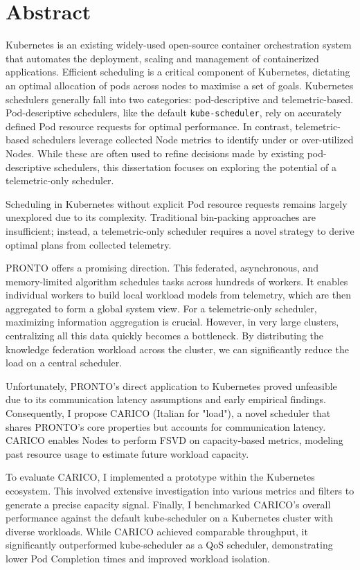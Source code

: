\chapter*{Abstract}

Kubernetes is an existing widely-used open-source container orchestration system
that automates the deployment, scaling and management of containerized
applications. Efficient scheduling is a critical component of Kubernetes,
dictating an optimal allocation of pods across nodes to maximise a set of goals.
Kubernetes schedulers generally fall into two categories: pod-descriptive and
telemetric-based. Pod-descriptive schedulers, like the default
\texttt{kube-scheduler}, rely on accurately defined Pod resource requests for
optimal performance. In contrast, telemetric-based schedulers leverage collected
Node metrics to identify under or over-utilized Nodes. While these are often
used to refine decisions made by existing pod-descriptive schedulers, this
dissertation focuses on exploring the potential of a telemetric-only scheduler.

Scheduling in Kubernetes without explicit Pod resource requests remains largely
unexplored due to its complexity. Traditional bin-packing approaches are
insufficient; instead, a telemetric-only scheduler requires a novel strategy to
derive optimal plans from collected telemetry.

PRONTO offers a promising direction. This federated, asynchronous, and
memory-limited algorithm schedules tasks across hundreds of workers. It enables
individual workers to build local workload models from telemetry, which are then
aggregated to form a global system view. For a telemetric-only scheduler,
maximizing information aggregation is crucial. However, in very large clusters,
centralizing all this data quickly becomes a bottleneck. By distributing the
knowledge federation workload across the cluster, we can significantly reduce
the load on a central scheduler.

Unfortunately, PRONTO's direct application to Kubernetes proved unfeasible due
to its communication latency assumptions and early empirical findings.
Consequently, I propose CARICO (Italian for "load"), a novel scheduler that
shares PRONTO's core properties but accounts for communication latency. CARICO
enables Nodes to perform FSVD on capacity-based metrics, modeling past resource
usage to estimate future workload capacity.

To evaluate CARICO, I implemented a prototype within the Kubernetes ecosystem.
This involved extensive investigation into various metrics and filters to
generate a precise capacity signal. Finally, I benchmarked CARICO's overall
performance against the default kube-scheduler on a Kubernetes cluster with
diverse workloads. While CARICO achieved comparable throughput, it significantly
outperformed kube-scheduler as a QoS scheduler, demonstrating lower Pod
Completion times and improved workload isolation.
